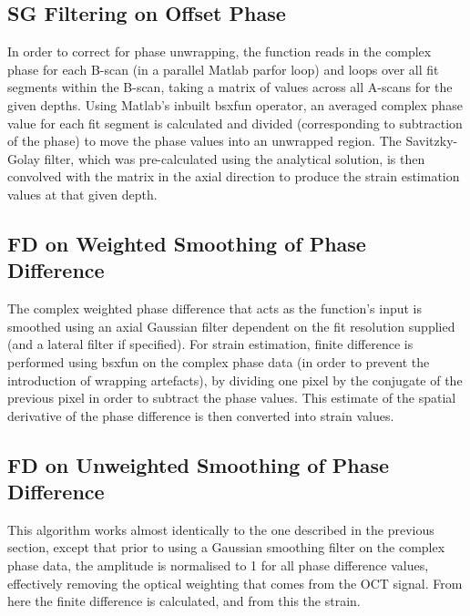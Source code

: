 \subsection{SG Filtering on Offset Phase}
In order to correct for phase unwrapping, the function reads in the complex phase for each B-scan (in a parallel Matlab parfor loop) and loops over all fit segments within the B-scan, taking a matrix of values across all A-scans for the given depths. Using Matlab's inbuilt bsxfun operator, an averaged complex phase value for each fit segment is calculated and divided (corresponding to subtraction of the phase) to move the phase values into an unwrapped region. The Savitzky-Golay filter, which was pre-calculated using the analytical solution, is then convolved with the matrix in the axial direction to produce the strain estimation values at that given depth. 

\subsection{FD on Weighted Smoothing of Phase Difference}
The complex weighted phase difference that acts as the function's input is smoothed using an axial Gaussian filter dependent on the fit resolution supplied (and a lateral filter if specified). For strain estimation, finite difference is performed using bsxfun on the complex phase data (in order to prevent the introduction of  wrapping artefacts), by dividing one pixel by the conjugate of the previous pixel in order to subtract the phase values. This estimate of the spatial derivative of the phase difference is then converted into strain values.

\subsection{FD on Unweighted Smoothing of Phase Difference}
This algorithm works almost identically to the one described in the previous section, except that prior to using a Gaussian smoothing filter on the complex phase data, the amplitude is normalised to 1 for all phase difference values, effectively removing the optical weighting that comes from the OCT signal. From here the finite difference is calculated, and from this the strain. 

